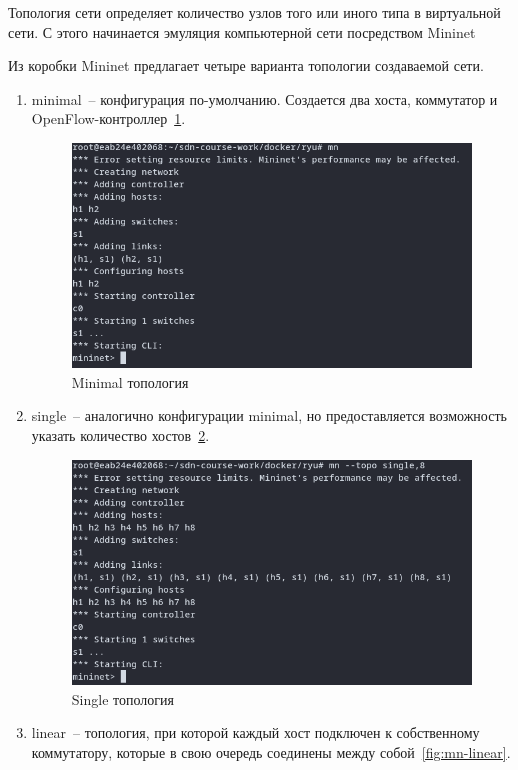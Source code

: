 \documentclass[bachelor, och, coursework]{SCWorks}
\begin{document}
Топология сети определяет количество узлов того или иного типа в виртуальной сети. С этого начинается эмуляция компьютерной сети посредством Mininet

Из коробки Mininet предлагает четыре варианта топологии создаваемой сети.
\begin{enumerate}
    \item minimal~-- конфигурация по-умолчанию. Создается два хоста, коммутатор и OpenFlow-контроллер~\ref{fig:mn-minimal}.
    \begin{figure}[H]
        \centering
        \includegraphics[width=\textwidth]{mn-minimal}
        \caption{Minimal топология}\label{fig:mn-minimal}
    \end{figure}
    \item single~-- аналогично конфигурации minimal, но предоставляется возможность указать количество хостов~\ref{fig:mn-single}.
    \begin{figure}[H]
        \centering
        \includegraphics[width=\textwidth]{mn-single}
        \caption{Single топология}\label{fig:mn-single}
    \end{figure}
    \item linear~-- топология, при которой каждый хост подключен к собственному коммутатору, которые в свою очередь соединены между собой~\ref{fig:mn-linear}.

\end{enumerate}
\end{document}

